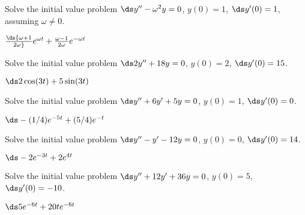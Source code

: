 \begin{enumialphparenastyle}

%
%

\begin{ex}
 Solve the initial value problem $\ds y''-\omega^2y=0$,
$y(0)=1$, $\ds y'(0)=1$, assuming $\omega\not=0$.
\begin{sol}
 $\ds {\omega+1\over2\omega}e^{\omega t}+
{\omega-1\over2\omega}e^{-\omega t}$
\end{sol}
\end{ex}


\begin{ex}
 Solve the initial value problem $\ds2y''+18y=0$,
$y(0)=2$, $\ds y'(0)=15$.
\begin{sol}
 $\ds 2\cos(3t)+5\sin(3t)$
\end{sol}
\end{ex}


\begin{ex}
 Solve the initial value problem 
$\ds y''+6y' +5y=0$,
$y(0)=1$, $\ds y'(0)=0$.
\begin{sol}
 $\ds -(1/4)e^{-5t}+(5/4)e^{-t}$
\end{sol}
\end{ex}


\begin{ex}
 Solve the initial value problem 
$\ds y''-y'-12y=0$,
$y(0)=0$, $\ds y'(0)=14$.
\begin{sol}
 $\ds-2e^{-3t}+2e^{4t}$
\end{sol}
\end{ex}


\begin{ex}
 Solve the initial value problem 
$\ds y''+12y'+36y=0$,
$y(0)=5$, $\ds y'(0)=-10$.
\begin{sol}
 $\ds 5e^{-6t}+20te^{-6t}$
\end{sol}
\end{ex}



\end{enumialphparenastyle}
